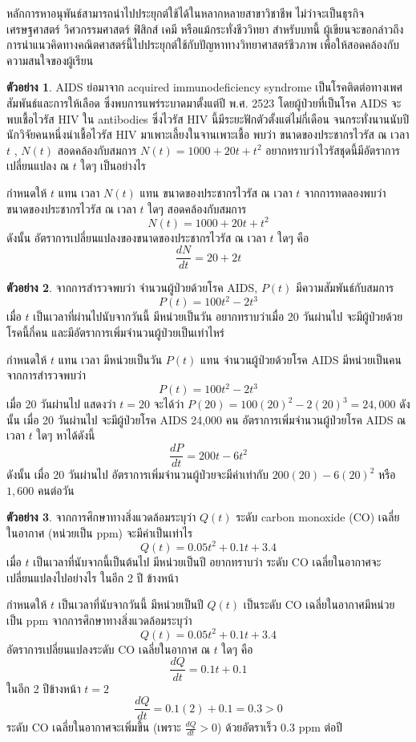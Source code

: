 \documentclass[
]{book}
\theoremstyle{definition}
\theoremstyle{definition}
\newtheorem{example}{ตัวอย่าง}[chapter]
\theoremstyle{definition}
\theoremstyle{definition}
\theoremstyle{remark}
\begin{document}
หลักการหาอนุพันธ์สามารถนำไปประยุกต์ใช้ได้ในหลากหลายสาขาวิชาชีพ ไม่ว่าจะเป็นธุรกิจ
เศรษฐศาสตร์ วิศวกรรมศาสตร์ ฟิสิกส์ เคมี หรือแม้กระทั่งชีววิทยา สำหรับบทนี้
ผู้เขียนจะขอกล่าวถึง การนำแนวคิดทางคณิตศาสตร์นี้ไปประยุกต์ใช้กับปัญหาทางวิทยาศาสตร์ชีวภาพ
เพื่อให้สอดคล้องกับความสนใจของผู้เรียน

\begin{example}
AIDS ย่อมาจาก acquired immunodeficiency syndrome
เป็นโรคติดต่อทางเพศสัมพันธ์และการให้เลือด ซึ่งพบการแพร่ระบาดมาตั้งแต่ปี พ.ศ. 2523
โดยผู้ป่วยที่เป็นโรค AIDS จะพบเชื้อไวรัส HIV ใน antibodies ซึ่งไวรัส HIV
นี้มีระยะฟักตัวตั้งแต่ไม่กี่เดือน จนกระทั่งนานนับปี นักวิจัยคนหนึ่งนำเชื้อไวรัส HIV
มาเพาะเลี้ยงในจานเพาะเชื้อ พบว่า ขนาดของประชากรไวรัส ณ เวลา \(t\) , \(N(t)\)
สอดคล้องกับสมการ \(N(t)=1000+20t+t^2\) อยากทราบว่าไวรัสชุดนี้มีอัตราการเปลี่ยนแปลง ณ
\(t\) ใดๆ เป็นอย่างไร
\end{example}

กำหนดให้ \(t\) แทน เวลา \(N(t)\) แทน ขนาดของประชากรไวรัส ณ เวลา \(t\)
จากการทดลองพบว่า ขนาดของประชากรไวรัส ณ เวลา \(t\) ใดๆ สอดคล้องกับสมการ
\[N(t)=1000+20t+t^2\] ดังนั้น อัตราการเปลี่ยนแปลงของขนาดของประชากรไวรัส ณ เวลา
\(t\) ใดๆ คือ \[\frac{dN}{dt}=20+2t\]

\begin{example}
จากการสำรวจพบว่า จำนวนผู้ป่วยด้วยโรค AIDS, \(P(t)\) มีความสัมพันธ์กับสมการ
\[P(t)=100t^2-2t^3\] เมื่อ \(t\) เป็นเวลาที่ผ่านไปนับจากวันนี้ มีหน่วยเป็นวัน
อยากทราบว่าเมื่อ 20 วันผ่านไป จะมีผู้ป่วยด้วยโรคนี้กี่คน
และมีอัตราการเพิ่มจำนวนผู้ป่วยเป็นเท่าไหร่
\end{example}

กำหนดให้ \(t\) แทน เวลา มีหน่วยเป็นวัน \(P(t)\) แทน จำนวนผู้ป่วยด้วยโรค AIDS
มีหน่วยเป็นคน จากการสำรวจพบว่า \[P(t)=100t^2-2t^3\] เมื่อ 20 วันผ่านไป แสดงว่า
\(t=20\) จะได้ว่า \(P(20)=100(20)^2-2(20)^3=24,000\) ดังนั้น เมื่อ 20 วันผ่านไป
จะมีผู้ป่วยโรค AIDS 24,000 คน อัตราการเพิ่มจำนวนผู้ป่วยโรค AIDS ณ เวลา \(t\) ใดๆ
หาได้ดังนี้ \[\frac{dP}{dt}=200t-6t^2\] ดังนั้น เมื่อ 20 วันผ่านไป
อัตราการเพิ่มจำนวนผู้ป่วยจะมีค่าเท่ากับ \(200(20)-6(20)^2\) หรือ \(1,600\) คนต่อวัน

\begin{example}
จากการศึกษาทางสิ่งแวดล้อมระบุว่า \(Q(t)\) ระดับ carbon monoxide (CO) เฉลี่ยในอากาศ
(หน่วยเป็น ppm) จะมีค่าเป็นเท่าไร \[Q(t)=0.05t^2+0.1t+3.4\] เมื่อ \(t\)
เป็นเวลาที่นับจากนี้เป็นต้นไป มีหน่วยเป็นปี อยากทราบว่า ระดับ CO
เฉลี่ยในอากาศจะเปลี่ยนแปลงไปอย่างไร ในอีก 2 ปี ข้างหน้า
\end{example}

กำหนดให้ \(t\) เป็นเวลาที่นับจากวันนี้ มีหน่วยเป็นปี \(Q(t)\) เป็นระดับ CO
เฉลี่ยในอากาศมีหน่วยเป็น ppm จากการศึกษาทางสิ่งแวดล้อมระบุว่า
\[Q(t)=0.05t^2+0.1t+3.4\] อัตราการเปลี่ยนแปลงระดับ CO เฉลี่ยในอากาศ ณ \(t\) ใดๆ
คือ \[\frac{dQ}{dt}=0.1t+0.1\] ในอีก 2 ปีข้างหน้า \(t=2\)
\[\frac{dQ}{dt}=0.1(2)+0.1=0.3>0\] ระดับ CO เฉลี่ยในอากาศจะเพิ่มขึ้น (เพราะ
\(\displaystyle\frac{dQ}{dt}>0\)) ด้วยอัตราเร็ว 0.3 ppm ต่อปี
\end{document}
